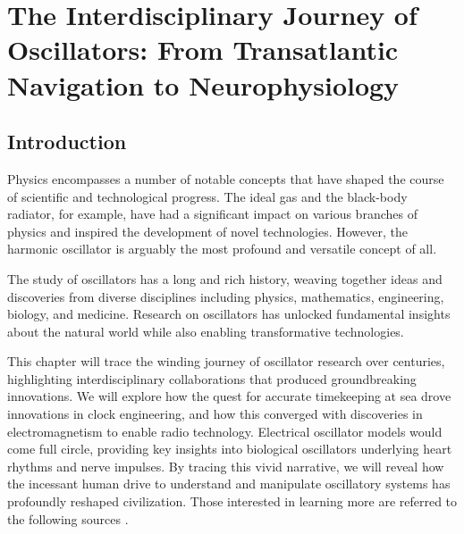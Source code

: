 \chapter{The Interdisciplinary Journey of Oscillators: From Transatlantic Navigation to Neurophysiology}
\label{ch17} 



\vspace{1cm}

\section{Introduction}

Physics encompasses a number of notable concepts that have shaped the course of scientific and technological progress. The ideal gas and the black-body radiator, for example, have had a significant impact on various branches of physics and inspired the development of novel technologies. However, the harmonic oscillator is arguably the most profound and versatile concept of all.

The study of oscillators has a long and rich history, weaving together ideas and discoveries from diverse disciplines including physics, mathematics, engineering, biology, and medicine. Research on oscillators has unlocked fundamental insights about the natural world while also enabling transformative technologies.

This chapter will trace the winding journey of oscillator research over centuries, highlighting interdisciplinary collaborations that produced groundbreaking innovations. We will explore how the quest for accurate timekeeping at sea drove innovations in clock engineering, and how this converged with discoveries in electromagnetism to enable radio technology. Electrical oscillator models would come full circle, providing key insights into biological oscillators underlying heart rhythms and nerve impulses. By tracing this vivid narrative, we will reveal how the incessant human drive to understand and manipulate oscillatory systems has profoundly reshaped civilization. Those interested in learning more are referred to the following sources \citep{vanderPol1926,vanderPol1928,vanderPol1960,Sobel2007,Brown2020,Parry1992,Hodgson1977,Cipolla2003,Baigrie2006,Maxwell2011-a,Maxwell2011-b,Clarke2011,Shamos1987,Izhikevich2006}.

